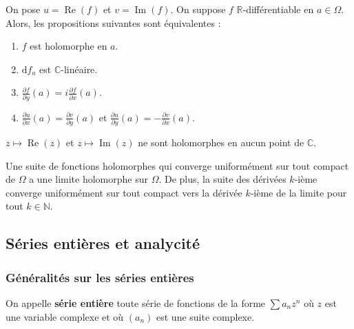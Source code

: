 
	\begin{theorem}
		On pose $u = \operatorname{Re}(f)$ et $v = \operatorname{Im}(f)$. On suppose $f$ $\mathbb{R}$-différentiable en $a \in \Omega$. Alors, les propositions suivantes sont équivalentes :
		\begin{enumerate}[label=(\roman*)]
			\item $f$ est holomorphe en $a$.
			\item $\mathrm{d}f_a$ est $\mathbb{C}$-linéaire.
			\item $\frac{\partial f}{\partial y} (a) = i \frac{\partial f}{\partial x} (a)$.
			\item $\frac{\partial u}{\partial x} (a) = \frac{\partial v}{\partial y} (a)$ et $\frac{\partial u}{\partial y} (a) = -\frac{\partial v}{\partial x} (a)$.
		\end{enumerate}
	\end{theorem}


	\begin{example}
		$z \mapsto \operatorname{Re}(z)$ et $z \mapsto \operatorname{Im}(z)$ ne sont holomorphes en aucun point de $\mathbb{C}$.
	\end{example}


	\begin{theorem}[Weierstrass]
		Une suite de fonctions holomorphes qui converge uniformément sur tout compact de $\Omega$ a une limite holomorphe sur $\Omega$. De plus, la suite des dérivées $k$-ième converge uniformément sur tout compact vers la dérivée $k$-ième de la limite pour tout $k \in \mathbb{N}$.
	\end{theorem}

	\subsection{Séries entières et analycité}

	\subsubsection{Généralités sur les séries entières}


	\begin{definition}
		On appelle \textbf{série entière} toute série de fonctions de la forme $\sum a_n z^n$ où $z$ est une variable complexe et où $(a_n)$ est une suite complexe.
	\end{definition}

